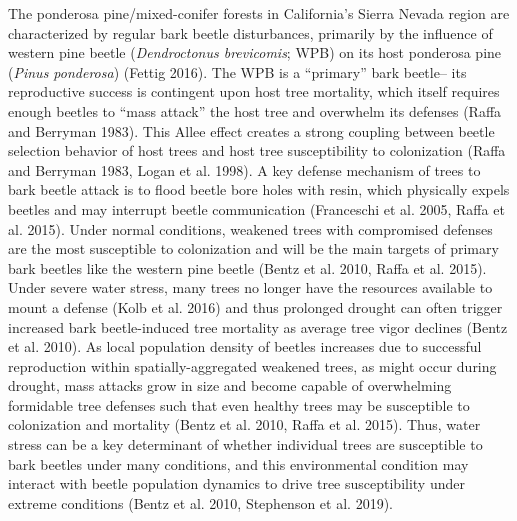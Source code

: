 \documentclass[]{article}
\begin{document}
The ponderosa pine/mixed-conifer forests in California's Sierra Nevada
region are characterized by regular bark beetle disturbances, primarily
by the influence of western pine beetle (\emph{Dendroctonus brevicomis};
WPB) on its host ponderosa pine (\emph{Pinus ponderosa}) (Fettig 2016).
The WPB is a ``primary'' bark beetle-- its reproductive success is
contingent upon host tree mortality, which itself requires enough
beetles to ``mass attack'' the host tree and overwhelm its defenses
(Raffa and Berryman 1983). This Allee effect creates a strong coupling
between beetle selection behavior of host trees and host tree
susceptibility to colonization (Raffa and Berryman 1983, Logan et al.
1998). A key defense mechanism of trees to bark beetle attack is to
flood beetle bore holes with resin, which physically expels beetles and
may interrupt beetle communication (Franceschi et al. 2005, Raffa et al.
2015). Under normal conditions, weakened trees with compromised defenses
are the most susceptible to colonization and will be the main targets of
primary bark beetles like the western pine beetle (Bentz et al. 2010,
Raffa et al. 2015). Under severe water stress, many trees no longer have
the resources available to mount a defense (Kolb et al. 2016) and thus
prolonged drought can often trigger increased bark beetle-induced tree
mortality as average tree vigor declines (Bentz et al. 2010). As local
population density of beetles increases due to successful reproduction
within spatially-aggregated weakened trees, as might occur during
drought, mass attacks grow in size and become capable of overwhelming
formidable tree defenses such that even healthy trees may be susceptible
to colonization and mortality (Bentz et al. 2010, Raffa et al. 2015).
Thus, water stress can be a key determinant of whether individual trees
are susceptible to bark beetles under many conditions, and this
environmental condition may interact with beetle population dynamics to
drive tree susceptibility under extreme conditions (Bentz et al. 2010,
Stephenson et al. 2019).
\end{document}
